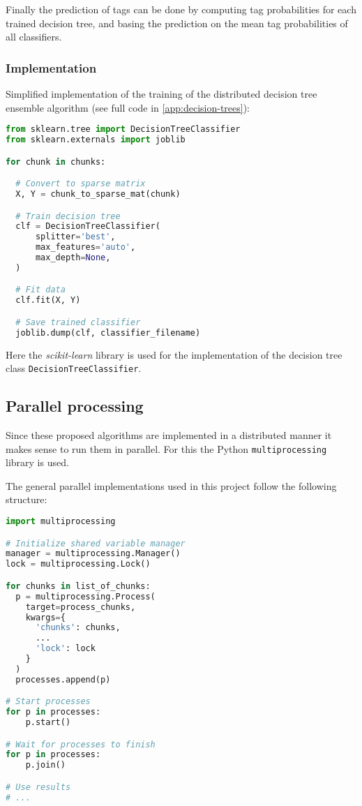 Finally the prediction of tags can be done by computing tag probabilities for
each trained decision tree, and basing the prediction on the mean tag probabilities
of all classifiers.

\subsubsection{Implementation}

Simplified implementation of the training of the distributed decision tree
ensemble algorithm (see full code in \cref{app:decision-trees}):

\begin{lstlisting}[language=python]
from sklearn.tree import DecisionTreeClassifier
from sklearn.externals import joblib

for chunk in chunks:

  # Convert to sparse matrix
  X, Y = chunk_to_sparse_mat(chunk)

  # Train decision tree
  clf = DecisionTreeClassifier(
      splitter='best',
      max_features='auto',
      max_depth=None,
  )

  # Fit data
  clf.fit(X, Y)

  # Save trained classifier
  joblib.dump(clf, classifier_filename)
\end{lstlisting}

Here the \textit{scikit-learn} library is used for the implementation of
the decision tree class \texttt{DecisionTreeClassifier}.

\subsection{Parallel processing}

Since these proposed algorithms are implemented in a distributed manner it makes
sense to run them in parallel. For this the Python \texttt{multiprocessing}
library is used.

The general parallel implementations used in this project follow the following
structure:

\begin{lstlisting}[language=python]
import multiprocessing

# Initialize shared variable manager
manager = multiprocessing.Manager()
lock = multiprocessing.Lock()

for chunks in list_of_chunks:
  p = multiprocessing.Process(
    target=process_chunks,
    kwargs={
      'chunks': chunks,
      ...
      'lock': lock
    }
  )
  processes.append(p)

# Start processes
for p in processes:
    p.start()

# Wait for processes to finish
for p in processes:
    p.join()

# Use results
# ...
\end{lstlisting}

